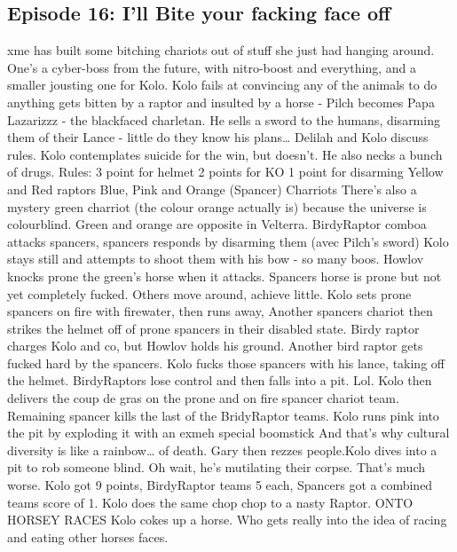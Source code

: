 \subsection{Episode 16: I'll Bite your facking face off}
xme has built some bitching chariots out of stuff she just had hanging around. One’s a cyber-boss from the future, with nitro-boost and everything, and a smaller jousting one for Kolo.\medskip
Kolo fails at convincing any of the animals to do anything gets bitten by a raptor and insulted by a horse - Pilch becomes Papa Lazarizzz - the blackfaced charletan. He sells a sword to the humans, disarming them of their Lance - little do they know his plans…\medskip
Delilah and Kolo discuss rules. Kolo contemplates suicide for the win, but doesn’t. He also necks a bunch of drugs.\medskip
Rules: 3 point for helmet 2 points for KO 1 point for disarming\medskip
Yellow and Red raptors\medskip
Blue, Pink and Orange (Spancer) Charriots\medskip
There’s also a mystery green charriot (the colour orange actually is) because the universe is colourblind. Green and orange are opposite in Velterra.\medskip
BirdyRaptor comboa attacks spancers, spancers responds by disarming them (avec Pilch’s sword)\medskip
Kolo stays still and attempts to shoot them with his bow - so many boos.\medskip
Howlov knocks prone the green’s horse when it attacks. Spancers horse is prone but not yet completely fucked.\medskip
Others move around, achieve little.\medskip
Kolo sets prone spancers on fire with firewater, then runs away, Another spancers chariot then strikes the helmet off of prone spancers in their disabled state.\medskip
Birdy raptor charges Kolo and co, but Howlov holds his ground.\medskip
Another bird raptor gets fucked hard by the spancers.\medskip
Kolo fucks those spancers with his lance, taking off the helmet.\medskip
BirdyRaptors lose control and then falls into a pit. Lol.\medskip
Kolo then delivers the coup de gras on the prone and on fire spancer chariot team.\medskip
Remaining spancer kills the last of the BridyRaptor teams.\medskip
Kolo runs pink into the pit by exploding it with an exmeh special boomstick\medskip
And that’s why cultural diversity is like a rainbow… of death.\medskip
Gary then rezzes people.Kolo dives into a pit to rob someone blind. Oh wait, he’s mutilating their corpse. That’s much worse.\medskip
Kolo got 9 points, BirdyRaptor teams 5 each, Spancers got a combined teams score of 1.\medskip
Kolo does the same chop chop to a nasty Raptor.\medskip
ONTO HORSEY RACES\medskip
Kolo cokes up a horse. Who gets really into the idea of racing and eating other horses faces.\medskip
